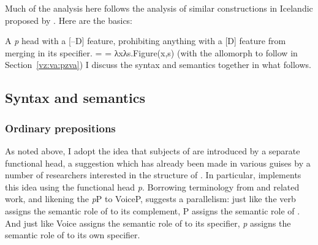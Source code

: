 \begin{exe}
\begin{xlist}
\begin{xlist}
\begin{exe}
\begin{xlist}
\begin{xlist}
\begin{exe}
\begin{xlist}
\begin{xlist}
\begin{exe}
\begin{exe}
\begin{xlist}
\begin{exe}
\begin{exe}
\begin{xlist}
\begin{exe}
\begin{exe}
\begin{exe}
\begin{exe}
\begin{exe}
\begin{xlist}
\begin{exe}
\begin{xlist}
\begin{exe}
\begin{exe}
\begin{xlist}
\begin{exe}
\begin{xlist}
\begin{exe}
\begin{exe}
\begin{exe}
\begin{xlist}
\begin{exe}
\begin{exe}
\begin{exe}
\begin{xlist}
\begin{exe}
\begin{xlist}
\begin{exe}
\begin{xlist}
\begin{exe}
\begin{xlist}
\begin{exe}
\begin{exe}
\begin{exe}
\begin{exe}
\begin{xlist}
\begin{exe}
\begin{xlist}
Much of the analysis here follows the analysis of similar constructions in Icelandic proposed by \cite{wood15springer}. Here are the basics:
 \begin{exe}
 \ex  \textbf{\pz} 
 \begin{xlist} 
 	\ex  A \textit{p} head with a [--D] feature, prohibiting anything with a [D] feature from merging in its specifier. 
     \ex  \denote{\pz} =  = λxλs.Figure(x,s) 
 	\ex  {\pz} {\lra} {\tnif} \hfill (with the allomorph {\thit} to follow in\\
 		\phantom{a} \hfill Section~\ref{vz:va:pzva}) 
 \z
\z 
I discuss the syntax and semantics together in what follows.

	\subsection{Syntax and semantics} \label{vz:pz:syn}	
		\subsubsection{Ordinary prepositions}
As noted above, I adopt the idea that subjects of  are introduced by a separate functional head, a suggestion which has already been made in various guises by a number of researchers interested in the structure of  \citep{vanriemsdijk90,rooryck96,koopman97,gehrke08phd,dendikken03,dendikken10}. In particular, \cite{svenonius03,svenonius07,svenonius10} implements this idea using the functional head \emph{p}. Borrowing terminology from \cite{talmy78} and related work, and likening the \emph{p}P to VoiceP, \cite{wood14nllt,wood15springer} suggests a parallelism: just like the verb assigns the semantic role of  to its complement, P assigns the semantic role of \textsc{}. And just like Voice assigns the semantic role of  to its specifier, \emph{p} assigns the semantic role of \textsc{} to its own specifier.


\end{xlist}
\end{exe}
\end{xlist}
\end{exe}
\end{xlist}
\end{exe}
\end{exe}
\end{exe}
\end{exe}
\end{xlist}
\end{exe}
\end{xlist}
\end{exe}
\end{xlist}
\end{exe}
\end{xlist}
\end{exe}
\end{exe}
\end{exe}
\end{xlist}
\end{exe}
\end{exe}
\end{exe}
\end{xlist}
\end{exe}
\end{xlist}
\end{exe}
\end{exe}
\end{xlist}
\end{exe}
\end{xlist}
\end{exe}
\end{exe}
\end{exe}
\end{exe}
\end{exe}
\end{xlist}
\end{exe}
\end{exe}
\end{xlist}
\end{exe}
\end{exe}
\end{xlist}
\end{xlist}
\end{exe}
\end{xlist}
\end{xlist}
\end{exe}
\end{xlist}
\end{xlist}
\end{exe}
